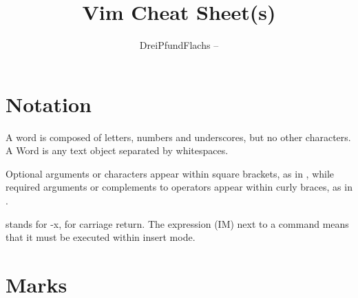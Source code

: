 \documentclass[a4paper,10pt]{amsart}
\begin{document}
\pagestyle{empty}
\title[]{Vim Cheat Sheet(s)}
\author{DreiPfundFlachs -- 
\href{https://github.com/dreipfundflachs}{}}
\maketitle




\section{Notation}\label{S:notation}
\thispagestyle{empty}


A word is composed of letters, numbers and underscores, but no other characters.
A Word is any text object separated by whitespaces. 

Optional arguments or
characters appear within square brackets, as in , while required
arguments or complements to operators appear within curly braces, as in
.

 stands for -x,  for carriage return. The
expression (IM) next to a command means that it must be executed within
insert mode. 



\section{Marks}\label{S:marks}
\end{document}
